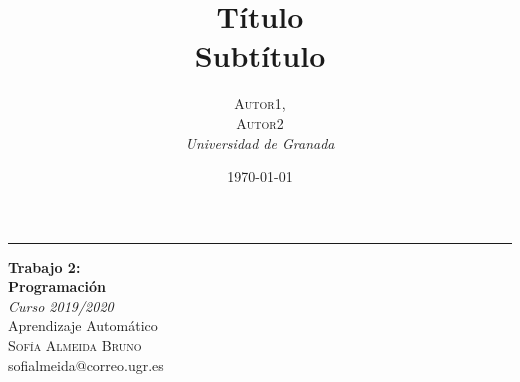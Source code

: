 \documentclass[a4paper, 20pt]{article}
\title{\textbf{Título}\\ %
Subtítulo} %
\author{\textsc{Autor1,\\Autor2} %
\\{\textit{Universidad de Granada}}} %
\date{\today} %
\begin{document}

\begin{titlepage} %
	
	\raggedleft %
	
	\rule{1pt}{\textheight} %
	\hspace{0.05\textwidth} %
	\parbox[b]{0.8\textwidth}{ %
		
		{\Huge\bfseries Trabajo 2:\\[0.5\baselineskip] Programación\\[2\baselineskip]} %
		{\large\textit{Curso 2019/2020}\\[0.5\baselineskip]Aprendizaje Automático\\[1\baselineskip] }%
		{\Large\textsc{Sofía Almeida Bruno}\\[0.5\baselineskip]sofialmeida@correo.ugr.es} %
		
		\vspace{0.4\textheight} %
		
		{\noindent \\[0.5\baselineskip] }\\[\baselineskip] %
	}

\end{titlepage}




{\parskip=2pt
  \tableofcontents
}
\pagebreak
\end{document}
